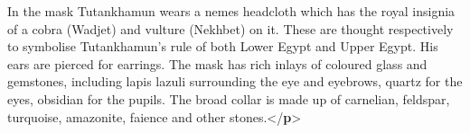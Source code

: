 \begin{shaded}
\hspace*{1em}\hspace*{1em}In the mask Tutankhamun wears a nemes headcloth which has the royal insignia of a cobra (Wadjet) and vulture\mbox{}\newline 
\hspace*{1em}\hspace*{1em}\hspace*{1em}\hspace*{1em}\hspace*{1em}\hspace*{1em} (Nekhbet) on it. These are thought respectively to symbolise Tutankhamun's rule of both Lower Egypt and Upper\mbox{}\newline 
\hspace*{1em}\hspace*{1em}\hspace*{1em}\hspace*{1em}\hspace*{1em}\hspace*{1em} Egypt. His ears are pierced for earrings. The mask has rich inlays of coloured glass and gemstones, including\mbox{}\newline 
\hspace*{1em}\hspace*{1em}\hspace*{1em}\hspace*{1em}\hspace*{1em}\hspace*{1em} lapis lazuli surrounding the eye and eyebrows, quartz for the eyes, obsidian for the pupils. The broad collar is\mbox{}\newline 
\hspace*{1em}\hspace*{1em}\hspace*{1em}\hspace*{1em}\hspace*{1em}\hspace*{1em} made up of carnelian, feldspar, turquoise, amazonite, faience and other stones.{</\textbf{p}>}\mbox{}\newline 
\hspace*{1em}\mbox{}\newline 
\hspace*{1em}\mbox{}\newline 

\end{shaded}
